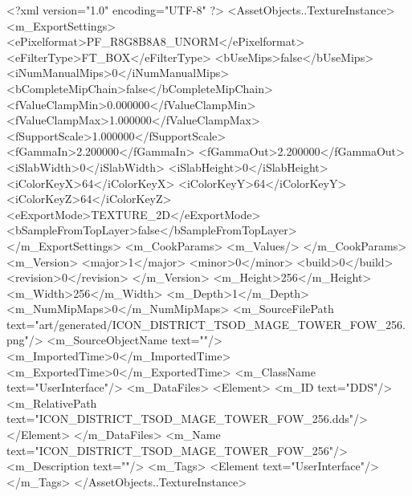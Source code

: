 <?xml version="1.0" encoding="UTF-8" ?>
<AssetObjects..TextureInstance>
	<m_ExportSettings>
		<ePixelformat>PF_R8G8B8A8_UNORM</ePixelformat>
		<eFilterType>FT_BOX</eFilterType>
		<bUseMips>false</bUseMips>
		<iNumManualMips>0</iNumManualMips>
		<bCompleteMipChain>false</bCompleteMipChain>
		<fValueClampMin>0.000000</fValueClampMin>
		<fValueClampMax>1.000000</fValueClampMax>
		<fSupportScale>1.000000</fSupportScale>
		<fGammaIn>2.200000</fGammaIn>
		<fGammaOut>2.200000</fGammaOut>
		<iSlabWidth>0</iSlabWidth>
		<iSlabHeight>0</iSlabHeight>
		<iColorKeyX>64</iColorKeyX>
		<iColorKeyY>64</iColorKeyY>
		<iColorKeyZ>64</iColorKeyZ>
		<eExportMode>TEXTURE_2D</eExportMode>
		<bSampleFromTopLayer>false</bSampleFromTopLayer>
	</m_ExportSettings>
	<m_CookParams>
		<m_Values/>
	</m_CookParams>
	<m_Version>
		<major>1</major>
		<minor>0</minor>
		<build>0</build>
		<revision>0</revision>
	</m_Version>
	<m_Height>256</m_Height>
	<m_Width>256</m_Width>
	<m_Depth>1</m_Depth>
	<m_NumMipMaps>0</m_NumMipMaps>
	<m_SourceFilePath text="art/generated/ICON_DISTRICT_TSOD_MAGE_TOWER_FOW_256.png"/>
	<m_SourceObjectName text=""/>
	<m_ImportedTime>0</m_ImportedTime>
	<m_ExportedTime>0</m_ExportedTime>
	<m_ClassName text="UserInterface"/>
	<m_DataFiles>
		<Element>
			<m_ID text="DDS"/>
			<m_RelativePath text="ICON_DISTRICT_TSOD_MAGE_TOWER_FOW_256.dds"/>
		</Element>
	</m_DataFiles>
	<m_Name text="ICON_DISTRICT_TSOD_MAGE_TOWER_FOW_256"/>
	<m_Description text=""/>
	<m_Tags>
		<Element text="UserInterface"/>
	</m_Tags>
</AssetObjects..TextureInstance>
